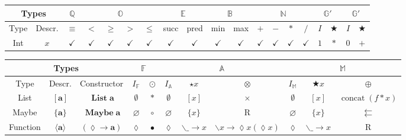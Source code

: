 \documentclass{jsarticle}
\begin{document}
\begin{center}
\begin{tabular}{||c|c||c||c|c|c|c||c|c||c|c||c|c|c|c||c|c||c|c||}
\hline
\multicolumn{2}{||c||}{Types}
    &\multicolumn{1}{|c||}{$\mathbb{Q}$}
    &\multicolumn{4}{|c||}{$\mathbb{O}$}
    &\multicolumn{2}{|c||}{$\mathbb{E}$}
    &\multicolumn{2}{|c||}{$\mathbb{B}$}
    &\multicolumn{4}{|c||}{$\mathbb{N}$}
    &\multicolumn{2}{|c||}{$\mathbb{G}'$}
    &\multicolumn{2}{|c||}{$\mathbb{G}'$}\\
\hline
Type
    &Descr.
    &$\equiv$
    &$<$
    &$\ge$
    &$>$
    &$\le$
    &succ
    &pred
    &min
    &max
    &$+$
    &$-$
    &$*$
    &$/$
    &$I$
    &$\bigstar$
    &$I$
    &$\bigstar$\\
\hline\hline
Int
    &$x$
    &$\checkmark$
    &$\checkmark$
    &$\checkmark$
    &$\checkmark$
    &$\checkmark$
    &$\checkmark$
    &$\checkmark$
    &$\checkmark$
    &$\checkmark$
    &$\checkmark$
    &$\checkmark$
    &$\checkmark$
    &$\checkmark$
    &$1$
    &$\ast$
    &$0$
    &$+$\\
\hline
\end{tabular}
\end{center}



\begin{center}
\begin{tabular}{||c|c|c||c|c||c|c|c||c|c|c||}
\hline
\multicolumn{3}{||c||}{Types}
    &\multicolumn{2}{|c||}{$\mathbb{F}$}
    &\multicolumn{3}{|c||}{$\mathbb{A}$}
    &\multicolumn{3}{|c||}{$\mathbb{M}$}\\
\hline
Type
    &Descr.
    &Constructor
    &$I_\mathbb{F}$
    &$\odot$
    &$I_\mathbb{A}$
    &$\star x$
    &$\otimes$
    &$I_\mathbb{M}$
    &$\bigstar x$
    &$\oplus$\\
\hline\hline
List
    &$[\mathbf{a}]$
    &$\mathop{\mathbf{List}}\mathbf{a}$
    &$\emptyset$
    &$\ast$
    &$\emptyset$
    &$[x]$
    &$\times$
    &$\emptyset$
    &$[x]$
    &$\mathop{\text{concat}}(f\ast x)$\\
\hline
Maybe
    &$\{\mathbf{a}\}$
    &$\mathop{\mathbf{Maybe}}\mathbf{a}$
    &$\varnothing$
    &$\circ$
    &$\varnothing$
    &$\{x\}$
    &R
    &$\varnothing$
    &$\{x\}$
    &$\leftleftarrows$\\
\hline
Function
    &$\langle\mathbf{a}\rangle$
    &$(\lozenge\longrightarrow\mathbf{a})$
    &$\lozenge$
    &$\bullet$
    &$\lozenge$
    &$\backslash\_\longrightarrow x$
    &$\backslash x\longrightarrow\lozenge x(\lozenge x)$
    &$\lozenge$
    &$\backslash\_\longrightarrow x$
    &R\\
\hline
\end{tabular}
\end{center}
\end{document}
